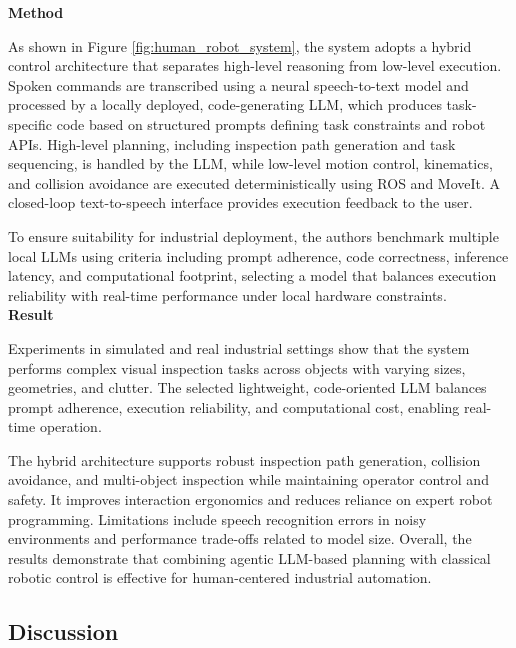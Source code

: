 \textbf{Method}

As shown in Figure \ref{fig:human_robot_system}, the system adopts a hybrid control architecture that separates high-level reasoning from low-level execution.
Spoken commands are transcribed using a neural speech-to-text model and processed by a locally deployed, code-generating LLM, which produces task-specific code based on structured prompts defining task constraints and robot APIs.
High-level planning, including inspection path generation and task sequencing, is handled by the LLM, while low-level motion control, kinematics, and collision avoidance are executed deterministically using ROS and MoveIt.
A closed-loop text-to-speech interface provides execution feedback to the user.

To ensure suitability for industrial deployment, the authors benchmark multiple local LLMs using criteria including prompt adherence, code correctness, inference latency, and computational footprint, selecting a model that balances execution reliability with real-time performance under local hardware constraints.
\\

\textbf{Result}

Experiments in simulated and real industrial settings show that the system performs complex visual inspection tasks across objects with varying sizes, geometries, and clutter.
The selected lightweight, code-oriented LLM balances prompt adherence, execution reliability, and computational cost, enabling real-time operation.

The hybrid architecture supports robust inspection path generation, collision avoidance, and multi-object inspection while maintaining operator control and safety.
It improves interaction ergonomics and reduces reliance on expert robot programming.
Limitations include speech recognition errors in noisy environments and performance trade-offs related to model size.
Overall, the results demonstrate that combining agentic LLM-based planning with classical robotic control is effective for human-centered industrial automation.
\\

\subsection{Discussion}

